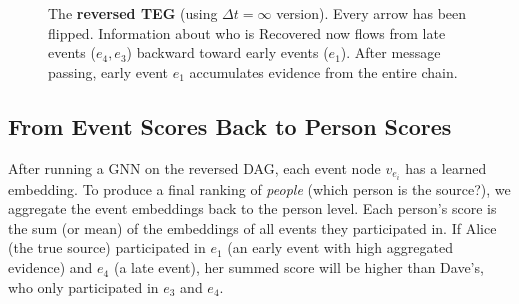 \begin{figure}[H]
\centering
{}
\caption{The \textbf{reversed TEG} (using $\Delta t = \infty$ version). Every
arrow has been flipped. Information about who is Recovered now flows from late
events ($e_4, e_3$) backward toward early events ($e_1$). After message
passing, early event $e_1$ accumulates evidence from the entire chain.}
\label{fig:teg_reversed}
\end{figure}

\subsection{From Event Scores Back to Person Scores}

After running a GNN on the reversed DAG, each event node $v_{e_i}$ has a
learned embedding. To produce a final ranking of \emph{people} (which person
is the source?), we aggregate the event embeddings back to the person level.
Each person's score is the sum (or mean) of the embeddings of all events they
participated in. If Alice (the true source) participated in $e_1$ (an early
event with high aggregated evidence) and $e_4$ (a late event), her summed score
will be higher than Dave's, who only participated in $e_3$ and $e_4$.

